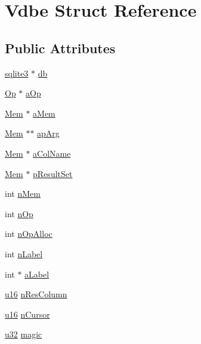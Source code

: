\hypertarget{struct_vdbe}{\section{Vdbe Struct Reference}
\label{struct_vdbe}
}
\subsection*{Public Attributes}
\begin{DoxyCompactItemize}
\item 
\hyperlink{structsqlite3}{sqlite3} $\ast$ \hyperlink{struct_vdbe_a495366101a593999f4d2ed905e839029}{db}
\item 
\hyperlink{sqlite3_8c_af3e8e0a774ea3e53b5d64297468c3298}{Op} $\ast$ \hyperlink{struct_vdbe_a1ba82f08947b275dd72a3e3095ad02d5}{a\-Op}
\item 
\hyperlink{struct_mem}{Mem} $\ast$ \hyperlink{struct_vdbe_ac36776c53b6ec9054a2826ec83f29953}{a\-Mem}
\item 
\hyperlink{struct_mem}{Mem} $\ast$$\ast$ \hyperlink{struct_vdbe_a74fd4612c55ac2fde475096a4d2605b5}{ap\-Arg}
\item 
\hyperlink{struct_mem}{Mem} $\ast$ \hyperlink{struct_vdbe_a900f557143e7d2ab8c560f7ada66d0f7}{a\-Col\-Name}
\item 
\hyperlink{struct_mem}{Mem} $\ast$ \hyperlink{struct_vdbe_a0dec47b8d8c481df2b73d5bbf9cdde11}{p\-Result\-Set}
\item 
int \hyperlink{struct_vdbe_a10a19309607617a75d3722219d3c7615}{n\-Mem}
\item 
int \hyperlink{struct_vdbe_a81e72e6812c71e13651f81cc3a6ca1d0}{n\-Op}
\item 
int \hyperlink{struct_vdbe_aa52020050ea42e10ad8be8ebdf470850}{n\-Op\-Alloc}
\item 
int \hyperlink{struct_vdbe_ae74cf1db577889e4f7ee669d613939a9}{n\-Label}
\item 
int $\ast$ \hyperlink{struct_vdbe_a8d9c9a70f5a5ffd037cc29cd3d3815b2}{a\-Label}
\item 
\hyperlink{sqlite3_8c_a20f2299e322dcbde37cb07b16910b843}{u16} \hyperlink{struct_vdbe_a525830c709542b280d11c764e9a9994a}{n\-Res\-Column}
\item 
\hyperlink{sqlite3_8c_a20f2299e322dcbde37cb07b16910b843}{u16} \hyperlink{struct_vdbe_adf7c35ba970bfc5f6e06a9f8248d5a32}{n\-Cursor}
\item 
\hyperlink{sqlite3_8c_a03ad5adfaeb9b7640dde78a0cc390319}{u32} \hyperlink{struct_vdbe_a01c61f8cafa6ad3eaafcc85c6f53f8ef}{magic}
\item 
$$
\end{DoxyCompactItemize}
